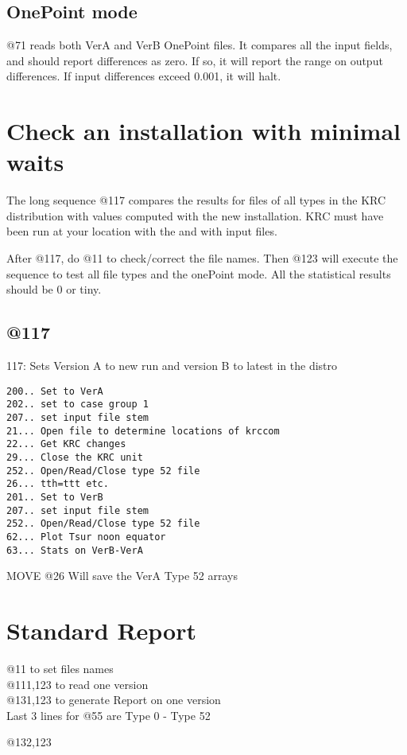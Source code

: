 \documentclass{article}  %
\begin{document}
\subsection{OnePoint mode}
 @71 reads both VerA and VerB OnePoint files. It compares all the input fields, and should report differences as zero. If so, it will report the range on output differences. If input differences exceed 0.001, it will halt.

\section{Check an installation with minimal waits}
The long sequence @117 compares the results for files of all types in the KRC distribution with values computed
with the new installation.  KRC must have been run at your location with the
 and with  input files.

After @117, do @11 to check/correct the file names.  Then @123 will execute the
 sequence to test all file types and the onePoint mode.  All the statistical
 results should be 0 or tiny.
\subsection{@117} %
117:  Sets Version A to new run and version B to latest in the distro
 
\vspace{-3.mm} 
\begin{verbatim}
200.. Set to VerA 
202.. set to case group 1
207.. set input file stem
21... Open file to determine locations of krccom
22... Get KRC changes
29... Close the KRC unit
252.. Open/Read/Close type 52 file
26... tth=ttt etc.
201.. Set to VerB
207.. set input file stem
252.. Open/Read/Close type 52 file
62... Plot Tsur noon equator
63... Stats on VerB-VerA
\end{verbatim}
  
 MOVE @26 Will save the VerA Type 52 arrays
\section{Standard Report}%
 @11 to set files names
\\ @111,123 to read one version
\\ @131,123 to generate Report on one version
\\ Last 3 lines for @55 are Type 0 - Type 52

@132,123 
\end{document}
